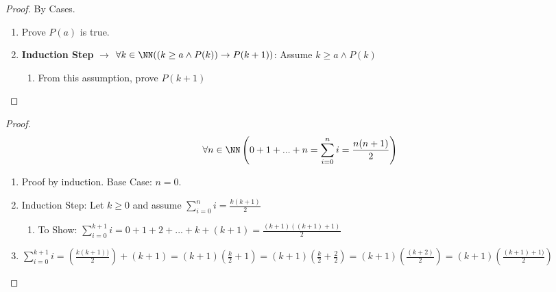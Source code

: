 \begin{proof} By Cases.
\begin{enumerate}
\item Prove $P(a)$ is true.
\item \textbf{Induction Step} $\to$ $\forall k \in \NN ((k\ge a \wedge P(k)) \to P(k+1))$: Assume $k \ge a \wedge P(k)$
	\begin{enumerate}
	\item From this assumption, prove $P(k+1)$
	\end{enumerate}
\end{enumerate}
\end{proof}
\begin{proof} 
\[ \forall n \in \NN \left( 0+1+...+n = \sum_{i=0}^n i = \frac{n(n+1)}{2} \right)\]
\begin{enumerate}
\item Proof by induction. Base Case: $n = 0$.
\item Induction Step: Let $k \ge 0$ and assume $\displaystyle\sum_{i=0}^n i = \frac{k(k+1)}{2} $
	\begin{enumerate}
	\item To Show: $\displaystyle\sum_{i=0}^{k+1} i = 0 + 1 + 2 + ... + k + (k+1) = \frac{(k+1)((k+1)+1)}{2} $
	\end{enumerate}
\item $\displaystyle\sum_{i=0}^{k+1} i = \left(\frac{k(k+1))}{2}\right) + (k+1) = (k+1)\left(\frac{k}{2} + 1\right) = (k+1)\left(\frac{k}{2} + \frac{2}{2}\right) = (k+1)\left(\frac{(k+2)}{2}\right) = (k+1)\left(\frac{(k+1)+1)}{2}\right)$ 
\end{enumerate}
\end{proof}



